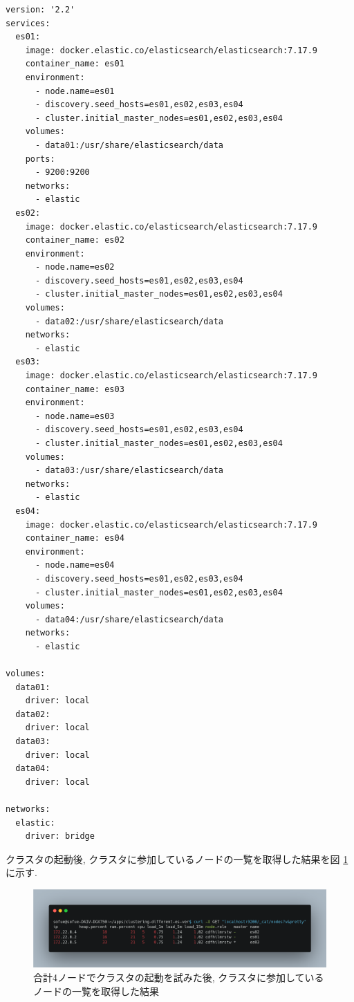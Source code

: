 \documentclass[a4j,12pt,]{jarticle}
\begin{document}
\begin{lstlisting}[caption=合計4ノードでクラスタBを起動する際に使用したdocker-compose.yml, label=sc3]
version: '2.2'
services:
  es01:
    image: docker.elastic.co/elasticsearch/elasticsearch:7.17.9
    container_name: es01
    environment:
      - node.name=es01
      - discovery.seed_hosts=es01,es02,es03,es04
      - cluster.initial_master_nodes=es01,es02,es03,es04
    volumes:
      - data01:/usr/share/elasticsearch/data
    ports:
      - 9200:9200
    networks:
      - elastic
  es02:
    image: docker.elastic.co/elasticsearch/elasticsearch:7.17.9
    container_name: es02
    environment:
      - node.name=es02
      - discovery.seed_hosts=es01,es02,es03,es04
      - cluster.initial_master_nodes=es01,es02,es03,es04
    volumes:
      - data02:/usr/share/elasticsearch/data
    networks:
      - elastic
  es03:
    image: docker.elastic.co/elasticsearch/elasticsearch:7.17.9
    container_name: es03
    environment:
      - node.name=es03
      - discovery.seed_hosts=es01,es02,es03,es04
      - cluster.initial_master_nodes=es01,es02,es03,es04
    volumes:
      - data03:/usr/share/elasticsearch/data
    networks:
      - elastic
  es04:
    image: docker.elastic.co/elasticsearch/elasticsearch:7.17.9
    container_name: es04
    environment:
      - node.name=es04
      - discovery.seed_hosts=es01,es02,es03,es04
      - cluster.initial_master_nodes=es01,es02,es03,es04
    volumes:
      - data04:/usr/share/elasticsearch/data
    networks:
      - elastic

volumes:
  data01:
    driver: local
  data02:
    driver: local
  data03:
    driver: local
  data04:
    driver: local

networks:
  elastic:
    driver: bridge
  \end{lstlisting}

クラスタの起動後, クラスタに参加しているノードの一覧を取得した結果を図 \ref{p3-1}に示す.

\begin{figure}[H]
  \begin{center}
    \includegraphics[width=160mm]{4nodes-list.png}
    \caption{合計4ノードでクラスタの起動を試みた後, クラスタに参加しているノードの一覧を取得した結果}
    \label{p3-1}
  \end{center}
\end{figure}
\end{document}
